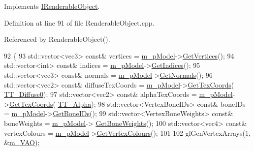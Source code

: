 Implements \hyperlink{class_i_renderable_object_a2d52e4ff9309bfa2f1ae1905d67d8691}{I\+Renderable\+Object}.



Definition at line 91 of file Renderable\+Object.\+cpp.



Referenced by Renderable\+Object().


\begin{DoxyCode}
92 \{
93   std::vector<vec3> \textcolor{keyword}{const}& vertices = \hyperlink{class_renderable_object_aab96dcc31d9e748645868c9449ae8cb6}{m\_pModel}->\hyperlink{class_i_mesh_collection_af3ad8b8f405ae37eaff19f9965ea6148}{GetVertices}();
94   std::vector<int> \textcolor{keyword}{const}& indices = \hyperlink{class_renderable_object_aab96dcc31d9e748645868c9449ae8cb6}{m\_pModel}->\hyperlink{class_i_mesh_collection_ab5ef69beb5b87b0d791ade776dfd3ad0}{GetIndices}();
95   std::vector<vec3> \textcolor{keyword}{const}& normals = \hyperlink{class_renderable_object_aab96dcc31d9e748645868c9449ae8cb6}{m\_pModel}->\hyperlink{class_i_mesh_collection_a752157903d879f04676e2515b8922947}{GetNormals}();
96   std::vector<vec2> \textcolor{keyword}{const}& diffuseTexCoords = \hyperlink{class_renderable_object_aab96dcc31d9e748645868c9449ae8cb6}{m\_pModel}->\hyperlink{class_model_ac09d49884daedc470b791727ee4af9e5}{GetTexCoords}(
      \hyperlink{_material_8h_a65468556d79304b3a4bfc464cc12e549a930f237c6d8e17be231333de7101cd87}{TT\_Diffuse0});
97   std::vector<vec2> \textcolor{keyword}{const}& alphaTexCoords = \hyperlink{class_renderable_object_aab96dcc31d9e748645868c9449ae8cb6}{m\_pModel}->\hyperlink{class_model_ac09d49884daedc470b791727ee4af9e5}{GetTexCoords}(
      \hyperlink{_material_8h_a65468556d79304b3a4bfc464cc12e549a910fc22c8e04281e120beb6222bdfcd3}{TT\_Alpha});
98   std::vector<VertexBoneIDs> \textcolor{keyword}{const}& boneIDs = \hyperlink{class_renderable_object_aab96dcc31d9e748645868c9449ae8cb6}{m\_pModel}->\hyperlink{class_model_aad48f547c3fd951378df3552d1b324e0}{GetBoneIDs}();
99   std::vector<VertexBoneWeights> \textcolor{keyword}{const}& boneWeights = \hyperlink{class_renderable_object_aab96dcc31d9e748645868c9449ae8cb6}{m\_pModel}->
      \hyperlink{class_model_a06a6597ce660c174d9cd30858341a8cd}{GetBoneWeights}();
100   std::vector<vec4> \textcolor{keyword}{const}& vertexColours = \hyperlink{class_renderable_object_aab96dcc31d9e748645868c9449ae8cb6}{m\_pModel}->\hyperlink{class_model_a002dc69d9e1482659a7bd573bc9eb59b}{GetVertexColours}();
101   
102   glGenVertexArrays(1, &\hyperlink{class_renderable_object_adf71c359139a157f0513f06a04d6a81d}{m\_VAO});

\end{DoxyCode}
